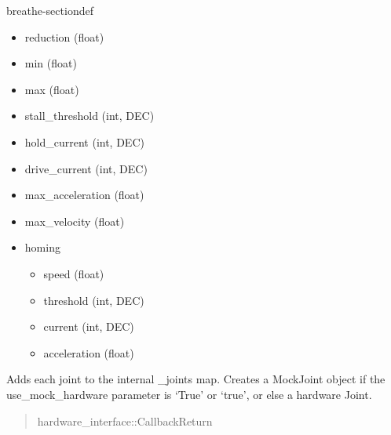 \documentclass[letterpaper,10pt,english]{sphinxmanual}
\begin{document}
\begin{fulllineitems}
\begin{sphinxuseclass}{breathe-sectiondef}
\begin{fulllineitems}
\begin{itemize}
\item {} 
\sphinxAtStartPar
reduction (float)

\item {} 
\sphinxAtStartPar
min (float)

\item {} 
\sphinxAtStartPar
max (float)

\item {} 
\sphinxAtStartPar
stall\_threshold (int, DEC)

\item {} 
\sphinxAtStartPar
hold\_current (int, DEC)

\item {} 
\sphinxAtStartPar
drive\_current (int, DEC)

\item {} 
\sphinxAtStartPar
max\_acceleration (float)

\item {} 
\sphinxAtStartPar
max\_velocity (float)

\item {} 
\sphinxAtStartPar
homing\begin{itemize}
\item {} 
\sphinxAtStartPar
speed (float)

\item {} 
\sphinxAtStartPar
threshold (int, DEC)

\item {} 
\sphinxAtStartPar
current (int, DEC)

\item {} 
\sphinxAtStartPar
acceleration (float)

\end{itemize}


\end{itemize}


\sphinxAtStartPar
Adds each joint to the internal \_joints map. Creates a MockJoint object if the use\_mock\_hardware parameter is ‘True’ or ‘true’, or else a hardware Joint. 
\begin{quote}\begin{description}
\sphinxAtStartPar
{} \textendash{} 

\sphinxAtStartPar
hardware\_interface::CallbackReturn 

\end{description}\end{quote}

\end{fulllineitems}


\end{sphinxuseclass}
\end{fulllineitems}
\end{document}
